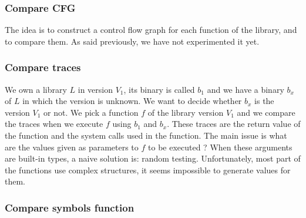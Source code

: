 \documentclass{article}
\newcommand{\symb}{{symbols}}
\newcommand{\comp}{{compilation}}
\begin{document}
	\subsubsection{Compare CFG}
	
	The idea is to construct a control flow  graph for each function of the library, and to compare them. As said previously, we have not experimented it yet.
	
	
	\subsubsection{Compare traces}


	We own a library $L$ in version $V_1$, its binary is called $b_1$ and we have a binary $b_x$ of $L$ in which the version is unknown. We want to decide whether $b_x$ is the version $V_1$ or not. We pick a function $f$ of the library version $V_1$ and we compare the traces when we execute $f$ using $b_1$ and $b_x$.	
	These traces are the return value of the function and the system calls used in the function.
	 The main issue is what are the values given as parameters to $f$ to be executed ? When these arguments are built-in types, a naive solution is: random testing. Unfortunately, most part of the functions use complex structures, it seems impossible to generate values for them.	
	
	\subsubsection{Compare symbols function}
	
\end{document}
